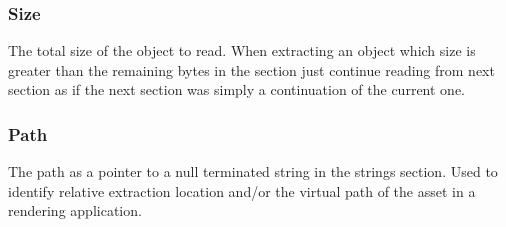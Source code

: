 \subsubsection{Size}
The total size of the object to read. When extracting an object which size is greater than the remaining bytes in the section just continue reading from next section as if the next section was simply a continuation of the current one.

\subsubsection{Path}
The path as a pointer to a null terminated string in the strings section. Used to identify relative extraction location and/or the virtual path of the asset in a rendering application.

